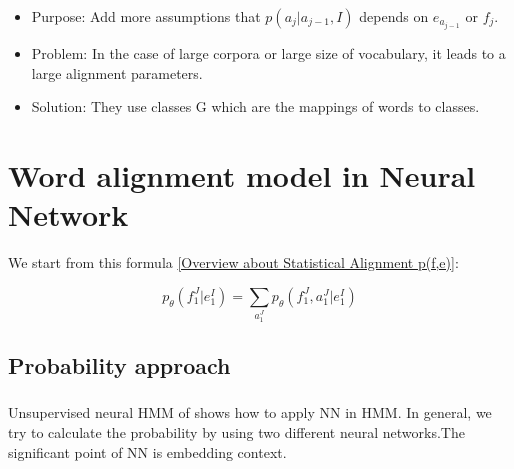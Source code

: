 \documentclass{article}
\begin{document}
\begin{itemize}
\item Purpose: Add more assumptions that $p(a_j | a_{j-1}, I)$ depends on $e_{a_{j -1}}$ or $f_j$.
\item Problem: In the case of large corpora or large size of vocabulary, it leads to a large alignment parameters.
\item Solution: They use classes G which are the mappings of words to classes.
\end{itemize}

\section{Word alignment model in Neural Network}
We start from this formula \eqref{Overview about Statistical Alignment p(f,e)}:

\begin{equation}
p_{\theta}(f_1^J|e_1^I) = \sum_{a_1^J} p_{\theta}(f_1^J, a_1^J|e_1^I)
\label{Word Alignment Model Neural Network p(f,e)}
\end{equation}

\subsection{Probability approach}
\subsubsection{\cite{Tran16unsupervised}}
Unsupervised neural HMM of \cite{Tran16unsupervised} shows how to apply NN in HMM. In general, we try to calculate the probability by using two different neural networks.The significant point of NN is embedding context.
\end{document}
